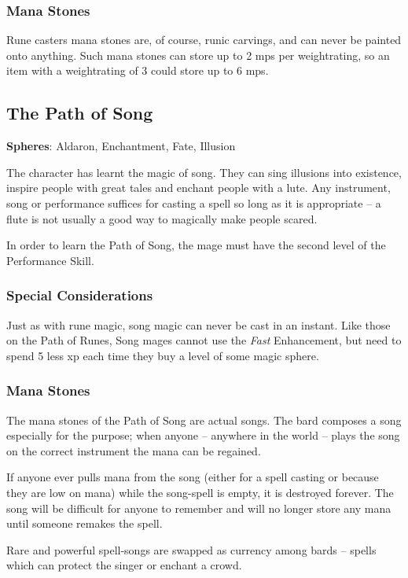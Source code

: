 \begin{multicols}{2}
\subsubsection{Mana Stones}

Rune casters mana stones are, of course, runic carvings, and can never be painted onto anything.
Such mana stones can store up to 2 \glspl{mp} per \gls{weightrating}, so an item with a \gls{weightrating} of 3 could store up to 6 \glspl{mp}.

\subsection{The Path of Song}

\label{song}\textbf{Spheres}: Aldaron, Enchantment, Fate, Illusion

The character has learnt the magic of song. They can sing illusions into existence, inspire people with great tales and enchant people with a lute. Any instrument, song or performance suffices for casting a spell so long as it is appropriate -- a flute is not usually a good way to magically make people scared.

In order to learn the Path of Song, the mage must have the second level of the Performance Skill. 

\subsubsection{Special Considerations}

Just as with rune magic, song magic can never be cast in an instant.
Like those on the Path of Runes, Song mages cannot use the \textit{Fast} Enhancement, but need to spend 5 less \gls{xp} each time they buy a level of some magic sphere.

\subsubsection{Mana Stones}

The mana stones of the Path of Song are actual songs.
The bard composes a song especially for the purpose; when anyone -- anywhere in the world -- plays the song on the correct instrument the mana can be regained.

If anyone ever pulls mana from the song (either for a spell casting or because they are low on mana) while the song-spell is empty, it is destroyed forever.
The song will be difficult for anyone to remember and will no longer store any mana until someone remakes the spell.

Rare and powerful spell-songs are swapped as currency among bards -- spells which can protect the singer or enchant a crowd.

\end{multicols}

